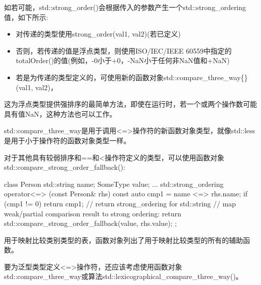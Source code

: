如若可能，std::strong\_order()会根据传入的参数产生一个std::strong\_ordering值，如下所示:

\begin{itemize}
\item
对传递的类型使用strong\_order(val1, val2)(若已定义)

\item
否则，若传递的值是浮点类型，则使用ISO/IEC/IEEE 60559中指定的totalOrder()的值(例如，-0小于+0，-NaN小于任何非NaN值和+NaN)

\item
若是为传递的类型定义的，可使用新的函数对象std::compare\_three\_way\{\}(val1, val2)，
\end{itemize}

这为浮点类型提供强排序的最简单方法，即使在运行时，若一个或两个操作数可能具有值NaN，这种方法也可以工作。

std::compare\_three\_way是用于调用<=>操作符的新函数对象类型，就像std::less是用于小于操作符的函数对象类型一样。

对于其他具有较弱排序和==和<操作符定义的类型，可以使用函数对象std::compare\_strong\_order\_fallback():

\begin{cpp}
class Person {
	std::string name;
	SomeType value;
	...
	std::strong_ordering operator<=> (const Person& rhs) const {
		auto cmp1 = name <=> rhs.name;
		if (cmp1 != 0) return cmp1; // return strong_ordering for std::string
		// map weak/partial comparison result to strong ordering:
		return std::compare_strong_order_fallback(value, rhs.value);
	}
};
\end{cpp}

用于映射比较类别类型的表，函数对象列出了用于映射比较类型的所有的辅助函数。

要为泛型类型定义<=>操作符，还应该考虑使用函数对象std::compare\_three\_way或算法std::lexicographical\_compare\_three\_way()。

